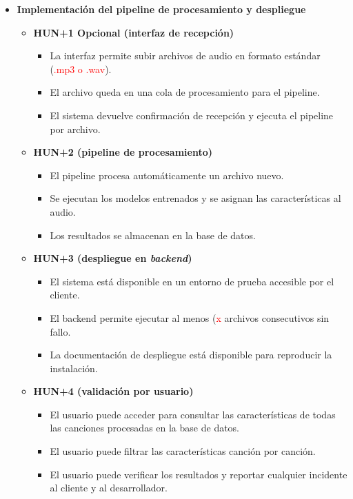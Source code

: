 \documentclass[
11pt, %
]{charter}
\begin{document}
\begin{itemize}
  \item \textbf{Implementación del pipeline de procesamiento y despliegue}
    \begin{itemize}
      \item \textbf{HUN+1 Opcional (interfaz de recepción)}
      \begin{itemize}
        \item La interfaz permite subir archivos de audio en formato estándar (\textcolor{red}{.mp3 o .wav}).
        \item El archivo queda en una cola de procesamiento para el pipeline.
        \item El sistema devuelve confirmación de recepción y ejecuta el pipeline por archivo.
      \end{itemize}
      \item \textbf{HUN+2 (pipeline de procesamiento)}
        \begin{itemize}
        \item El pipeline procesa automáticamente un archivo nuevo.
        \item Se ejecutan los modelos entrenados y se asignan las características al audio.
        \item Los resultados se almacenan en la base de datos.
        \end{itemize}
      \item \textbf{HUN+3 (despliegue en \textit{backend})}
      \begin{itemize}
        \item El sistema está disponible en un entorno de prueba accesible por el cliente.
        \item El backend permite ejecutar al menos (\textcolor{red}{x} archivos consecutivos sin fallo.
        \item La documentación de despliegue está disponible para reproducir la instalación.
      \end{itemize}
      \item \textbf{HUN+4 (validación por usuario)}
      \begin{itemize}
        \item El usuario puede acceder para consultar las características de todas las canciones procesadas en la base de datos.
        \item El usuario puede filtrar las características canción por canción.
        \item El usuario puede verificar los resultados y reportar cualquier incidente al cliente y al desarrollador.
      \end{itemize}
    \end{itemize}

\end{itemize}
\end{document}
